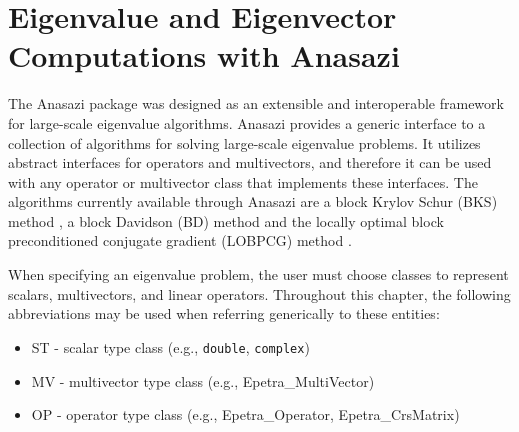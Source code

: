 % 
% 
% 
%   
%   
% 
% 

\section{Eigenvalue and Eigenvector Computations with Anasazi}
\label{chap:anasazi}

The Anasazi package was designed as an extensible and interoperable framework
for large-scale eigenvalue algorithms. Anasazi provides a generic interface to a
collection of algorithms for solving large-scale eigenvalue problems. It
utilizes abstract interfaces for operators and multivectors, and therefore it
can be used with any operator or multivector class that implements these
interfaces. The algorithms currently available through Anasazi are a block
Krylov Schur (BKS) method \cite{Stewart2001}, a block Davidson (BD) method and
the locally optimal block preconditioned conjugate gradient (LOBPCG) method
\cite{Knyazev2001}.

When specifying an eigenvalue problem, the user must choose classes to represent
scalars, multivectors, and linear operators. Throughout this chapter, the
following abbreviations may be used when referring generically to these
entities:
\begin{itemize}
\item ST - scalar type class (e.g., \verb!double!, \verb!complex!)
\item MV - multivector type class (e.g., Epetra\_MultiVector)
\item OP - operator type class (e.g., Epetra\_Operator, Epetra\_CrsMatrix)
\end{itemize}

